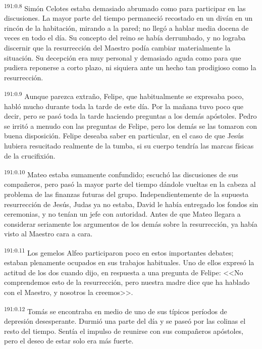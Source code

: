 \par 
\textsuperscript{191:0.8} Simón Celotes estaba demasiado abrumado como para participar en las discusiones. La mayor parte del tiempo permaneció recostado en un diván en un rincón de la habitación, mirando a la pared; no llegó a hablar media docena de veces en todo el día. Su concepto del reino se había derrumbado, y no lograba discernir que la resurrección del Maestro podía cambiar materialmente la situación. Su decepción era muy personal y demasiado aguda como para que pudiera reponerse a corto plazo, ni siquiera ante un hecho tan prodigioso como la resurrección.

\par 
\textsuperscript{191:0.9} Aunque parezca extraño, Felipe, que habitualmente se expresaba poco, habló mucho durante toda la tarde de este día. Por la mañana tuvo poco que decir, pero se pasó toda la tarde haciendo preguntas a los demás apóstoles. Pedro se irritó a menudo con las preguntas de Felipe, pero los demás se las tomaron con buena disposición. Felipe deseaba saber en particular, en el caso de que Jesús hubiera resucitado realmente de la tumba, si su cuerpo tendría las marcas físicas de la crucifixión.

\par 
\textsuperscript{191:0.10} Mateo estaba sumamente confundido; escuchó las discusiones de sus compañeros, pero pasó la mayor parte del tiempo dándole vueltas en la cabeza al problema de las finanzas futuras del grupo. Independientemente de la supuesta resurrección de Jesús, Judas ya no estaba, David le había entregado los fondos sin ceremonias, y no tenían un jefe con autoridad. Antes de que Mateo llegara a considerar seriamente los argumentos de los demás sobre la resurrección, ya había visto al Maestro cara a cara.

\par 
\textsuperscript{191:0.11} Los gemelos Alfeo participaron poco en estos importantes debates; estaban plenamente ocupados en sus trabajos habituales. Uno de ellos expresó la actitud de los dos cuando dijo, en respuesta a una pregunta de Felipe: <<No comprendemos esto de la resurrección, pero nuestra madre dice que ha hablado con el Maestro, y nosotros la creemos>>.

\par 
\textsuperscript{191:0.12} Tomás se encontraba en medio de uno de sus típicos períodos de depresión desesperante. Durmió una parte del día y se paseó por las colinas el resto del tiempo. Sentía el impulso de reunirse con sus compañeros apóstoles, pero el deseo de estar solo era más fuerte.

